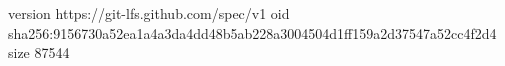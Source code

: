 version https://git-lfs.github.com/spec/v1
oid sha256:9156730a52ea1a4a3da4dd48b5ab228a3004504d1ff159a2d37547a52cc4f2d4
size 87544
